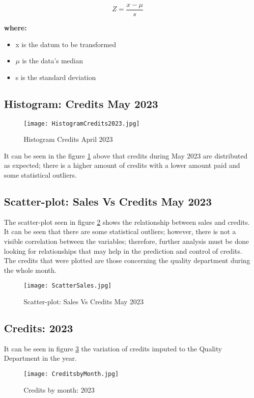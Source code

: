\documentclass[12pt,a4paper, USA]{article}
\begin{document}
\begin{equation}
    Z = \frac{x - \mu}{s}
\end{equation}

\textbf{where:}
\begin{itemize}
    \item{x is the datum to be transformed}
    \item{$\mu$ is the data's median}
    \item{s is the standard deviation}
\end{itemize}

\subsection{Histogram: Credits May 2023}

\begin{figure}[H]
    \centering
    \texttt{[image: HistogramCredits2023.jpg]}
    \caption{Histogram Credits April 2023}
    \label{fig: HistogramCredits2023}
\end{figure}

It can be seen in the figure \ref{fig: HistogramCredits2023} above that credits during  May 2023 are distributed as expected; there is a higher amount of credits with a lower amount paid and some statistical outliers.

\subsection{Scatter-plot: Sales Vs Credits May 2023}

The scatter-plot seen in figure \ref{fig: ScatterSales2023} shows the relationship between sales and credits. It can be seen that there are some statistical outliers; however, there is not a visible correlation between the variables; therefore, further analysis must be done looking for relationships that may help in the prediction and control of credits. The credits that were plotted are those concerning the quality department during the whole month.

\begin{figure}[H]
    \centering
    \texttt{[image: ScatterSales.jpg]}
    \caption{Scatter-plot: Sales Vs Credits May 2023}
    \label{fig: ScatterSales2023}
\end{figure}

\subsection{Credits: 2023}

It can be seen in figure \ref{fig: CreditsbyMonth} the variation of credits imputed to the Quality Department in the year.

\begin{figure}[H]
    \centering
    \texttt{[image: CreditsbyMonth.jpg]}
    \caption{Credits by month: 2023}
    \label{fig: CreditsbyMonth}
\end{figure}
\end{document}
